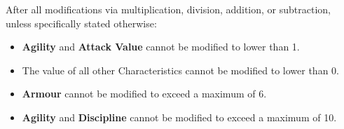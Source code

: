 After all modifications via multiplication, division, addition, or subtraction, unless specifically stated otherwise:

\begin{itemize}
\item \textbf{Agility} and \textbf{Attack Value} cannot be modified to lower than 1.
\item The value of all other Characteristics cannot be modified to lower than 0.
\item \textbf{Armour} cannot be modified to exceed a maximum of 6.
\item \textbf{Agility} and \textbf{Discipline} cannot be modified to exceed a maximum of 10.
\end{itemize}
